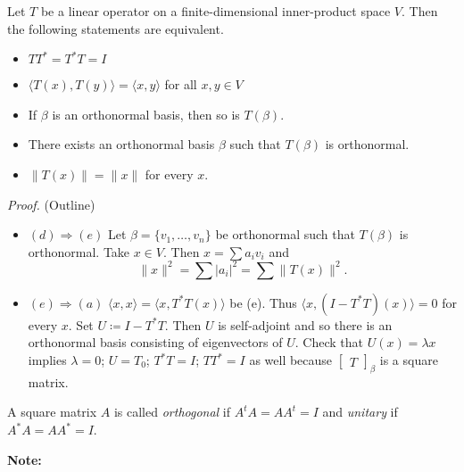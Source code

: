 \documentclass[12pt]{article}
\newenvironment{theorem}[2][Theorem]{\begin{trivlist}
\item[\hskip \labelsep {\bfseries #1}\hskip \labelsep {\bfseries #2.}]}{\end{trivlist}}
\newenvironment{definition}[2][Definition]{\begin{trivlist}
\item[\hskip \labelsep {\bfseries #1}\hskip \labelsep {\bfseries #2}]}{\end{trivlist}}
\begin{document}
\begin{theorem}{6.18}
Let $T$ be a linear operator on a finite-dimensional inner-product space $V$. Then the following statements are equivalent.

\begin{itemize}
    \item[(a)] $TT^* = T^*T = I$
    
    \item[(b)] $\langle T(x), T(y) \rangle = \langle x, y \rangle$ for all $x, y \in V$
    
    \item[(c)] If $\beta$ is an orthonormal basis, then so is $T(\beta)$.
    
    \item[(d)] There exists an orthonormal basis $\beta$ such that $T(\beta)$ is orthonormal.
    
    \item[(e)] $\lVert T(x) \lVert = \lVert x \rVert$ for every $x$.
\end{itemize}
\end{theorem}

\textit{Proof.} (Outline) 

\begin{itemize}
    \item $(d) \Longrightarrow (e)$ Let $\beta = \{v_1, \dots, v_n\}$ be orthonormal such that $T(\beta)$ is orthonormal. Take $x \in V$. Then $x = \sum a_iv_i$ and $$\lVert x \rVert^2 = \sum \lvert a_i \rvert^2 = \sum \lVert T(x) \rVert^2.$$  
    
    \item $(e) \Longrightarrow (a)$ $\langle x, x \rangle = \langle x, T^*T(x) \rangle$ be (e). Thus $\langle x, (I - T^*T)(x) \rangle = 0$ for every $x$. Set $U \coloneqq I - T^*T$. Then $U$ is self-adjoint and so there is an orthonormal basis consisting of eigenvectors of $U$. Check that $U(x) = \lambda x$ implies $\lambda = 0$; $U = T_0$; $T^*T = I$; $TT^* = I$ as well because $\begin{bmatrix} T \end{bmatrix}_\beta$ is a square matrix.
\end{itemize}

\begin{definition}{10}
A square matrix $A$ is called \textit{orthogonal} if $A^tA = AA^t = I$ and \textit{unitary} if $A^*A = AA^* = I$.
\end{definition}

\noindent\textbf{Note:} \text{ }
\end{document}
